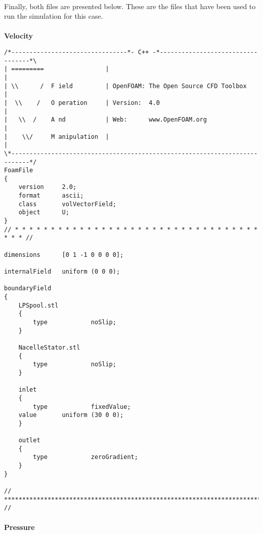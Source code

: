 \paragraph{}Finally, both files are presented below. These are the files that have been used to run the simulation for this case.

\paragraph{}\textbf{Velocity}

\begin{footnotesize}
\begin{verbatim}
/*--------------------------------*- C++ -*----------------------------------*\
| =========                 |                                                 |
| \\      /  F ield         | OpenFOAM: The Open Source CFD Toolbox           |
|  \\    /   O peration     | Version:  4.0                                   |
|   \\  /    A nd           | Web:      www.OpenFOAM.org                      |
|    \\/     M anipulation  |                                                 |
\*---------------------------------------------------------------------------*/
FoamFile
{
    version     2.0;
    format      ascii;
    class       volVectorField;
    object      U;
}
// * * * * * * * * * * * * * * * * * * * * * * * * * * * * * * * * * * * * * //

dimensions      [0 1 -1 0 0 0 0];

internalField   uniform (0 0 0);

boundaryField
{
    LPSpool.stl
    {
        type            noSlip;
    }

    NacelleStator.stl
    {
        type            noSlip;
    }

    inlet
    {
        type            fixedValue;
	value		uniform (30 0 0);
    }

    outlet
    {
        type            zeroGradient;
    }
}

// ************************************************************************* //

\end{verbatim}
\end{footnotesize}

\paragraph{}\textbf{Pressure}

